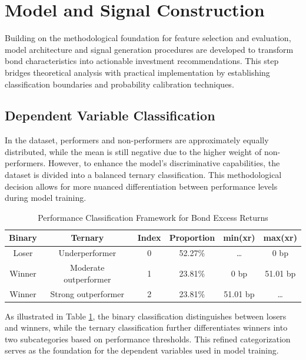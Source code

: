 \section{Model and Signal Construction}
\label{sec:model_signal_construction}

Building on the methodological foundation for feature selection and evaluation, model architecture and signal generation procedures are developed to transform bond characteristics into actionable investment recommendations. This step bridges theoretical analysis with practical implementation by establishing classification boundaries and probability calibration techniques.

\subsection{Dependent Variable Classification}

In the dataset, performers and non-performers are approximately equally distributed, while the mean is still negative due to the higher weight of non-performers. However, to enhance the model's discriminative capabilities, the dataset is divided into a balanced ternary classification. This methodological decision allows for more nuanced differentiation between performance levels during model training.

\begin{table}[h]
\centering
\small
\begin{tabular}{cccccc}\toprule
\textbf{Binary} & \textbf{Ternary} & \textbf{Index} & \textbf{Proportion} & \textbf{min(xr)} & \textbf{max(xr)} \\\midrule
Loser & Underperformer & 0 & 52.27\% & \ldots & 0 bp \\
Winner & Moderate outperformer & 1 & 23.81\% & 0 bp & 51.01 bp \\
Winner & Strong outperformer & 2 & 23.81\% & 51.01 bp & \ldots \\ \bottomrule
\end{tabular}
\caption{Performance Classification Framework for Bond Excess Returns}
\label{tab:performance_classification}
\end{table}

As illustrated in Table \ref{tab:performance_classification}, the binary classification distinguishes between losers and winners, while the ternary classification further differentiates winners into two subcategories based on performance thresholds. This refined categorization serves as the foundation for the dependent variables used in model training.

